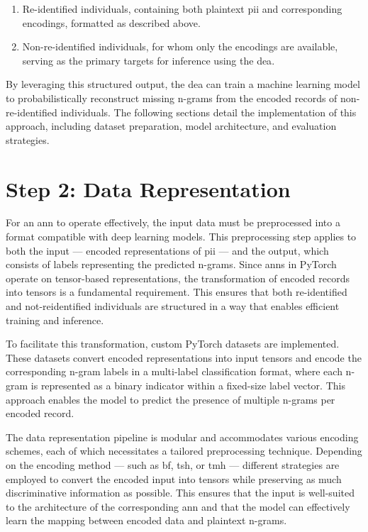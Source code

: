 \begin{enumerate}
    \item Re-identified individuals, containing both plaintext \ac{pii} and corresponding encodings, formatted as described above.
    \item Non-re-identified individuals, for whom only the encodings are available, serving as the primary targets for inference using the \ac{dea}.
\end{enumerate}

By leveraging this structured output, the \ac{dea} can train a machine learning model to probabilistically reconstruct missing n-grams from the encoded records of non-re-identified individuals.
The following sections detail the implementation of this approach, including dataset preparation, model architecture, and evaluation strategies.

\section{Step 2: Data Representation} \label{sec:representation}

For an \ac{ann} to operate effectively, the input data must be preprocessed into a format compatible with deep learning models.
This preprocessing step applies to both the input — encoded representations of \ac{pii} — and the output, which consists of labels representing the predicted n-grams.
Since \ac{ann}s in PyTorch operate on tensor-based representations, the transformation of encoded records into tensors is a fundamental requirement.
This ensures that both re-identified and not-reidentified individuals are structured in a way that enables efficient training and inference.

To facilitate this transformation, custom PyTorch datasets are implemented.
These datasets convert encoded representations into input tensors and encode the corresponding n-gram labels in a multi-label classification format, where each n-gram is represented as a binary indicator within a fixed-size label vector.
This approach enables the model to predict the presence of multiple n-grams per encoded record.

The data representation pipeline is modular and accommodates various encoding schemes, each of which necessitates a tailored preprocessing technique.
Depending on the encoding method — such as \ac{bf}, \ac{tsh}, or \ac{tmh} — different strategies are employed to convert the encoded input into tensors while preserving as much discriminative information as possible.
This ensures that the input is well-suited to the architecture of the corresponding \ac{ann} and that the model can effectively learn the mapping between encoded data and plaintext n-grams.

